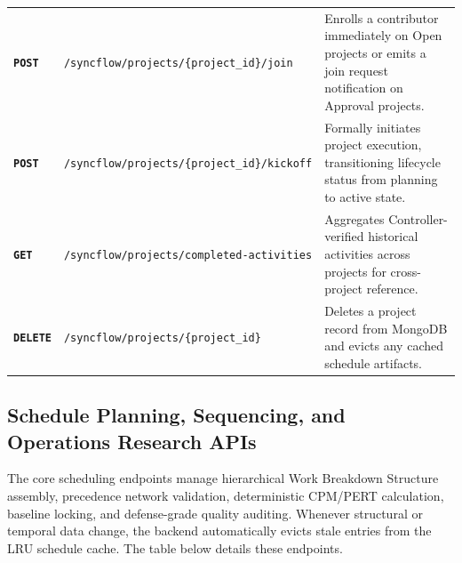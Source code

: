\begin{table}[H]
\begin{tabularx}{\textwidth}{p{1.3cm} >{\raggedright\arraybackslash}p{6.0cm} X}
\textbf{\texttt{POST}} & \texttt{/syncflow/projects/\{project\_id\}/\allowbreak join} & Enrolls a contributor immediately on Open projects or emits a join request notification on Approval projects. \\
\textbf{\texttt{POST}} & \texttt{/syncflow/projects/\{project\_id\}/\allowbreak kickoff} & Formally initiates project execution, transitioning lifecycle status from planning to active state. \\
\textbf{\texttt{GET}} & \texttt{/syncflow/projects/\allowbreak completed-activities} & Aggregates Controller-verified historical activities across projects for cross-project reference. \\
\textbf{\texttt{DELETE}} & \texttt{/syncflow/projects/\{project\_id\}} & Deletes a project record from MongoDB and evicts any cached schedule artifacts. \\
\bottomrule
\end{tabularx}
\end{table}

\newpage

\subsection{Schedule Planning, Sequencing, and Operations Research APIs}
The core scheduling endpoints manage hierarchical Work Breakdown Structure assembly, precedence network validation, deterministic CPM/PERT calculation, baseline locking, and defense-grade quality auditing. Whenever structural or temporal data change, the backend automatically evicts stale entries from the LRU schedule cache. The table below details these endpoints. 

\vspace{4mm}

